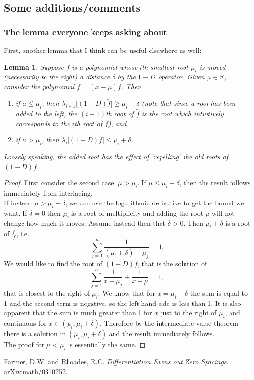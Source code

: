 \documentclass[11pt]{article}
\newcommand{\R}{\mathbb{R}}
\newtheorem{lemma}[theorem]{Lemma}
\begin{document}
\subsection{Some additions/comments}
\subsubsection{The lemma everyone keeps asking about}
First, another lemma that I think can be useful elsewhere as well:
\begin{lemma}
	Suppose $f$ is a polynomial whose $i$th smallest root $\mu_i$ is moved (necessarily to the right) a distance $\delta$ by the $1-D$ operator. Given $\mu \in \R$, consider the polynomial $\tilde{f} = (x-\mu)f$. Then
	\begin{enumerate}
		\item if $\mu \leq \mu_i$, then $\lambda_{i+1}\big[(1-D)\tilde{f}\big] \geq \mu_i + \delta$ (note that since a root has been added to the left, the $(i+1)$th root of $\tilde{f}$ is the root which intuitively corresponds to the $i$th root of $f$), and 
		\item if $\mu > \mu_i$, then $\lambda_{i}\big[(1-D)\tilde{f}\big] \leq \mu_i + \delta$.
	\end{enumerate}
	Loosely speaking, the added root has the effect of `repelling' the old roots of $(1-D)f$.
\end{lemma}
\begin{proof}
	First consider the second case, $\mu > \mu_i$. If $\mu \leq \mu_i + \delta$, then the result follows immediately from interlacing. \\
	If instead $\mu > \mu_i + \delta$, we can use the logarithmic derivative to get the bound we want. If $\delta=0$ then $\mu_i$ is a root of multiplicity and adding the root $\mu$ will not change how much it moves. Assume instead then that $\delta>0$. Then $\mu_i+\delta$ is a root of $\frac{f^\prime}{f}$, i.e.
		\[ \sum_{j=1}^n \frac{1}{(\mu_i+\delta)-\mu_j} = 1. \]
	We would like to find the root of $(1-D)\tilde{f}$, that is the solution of
		\[ \sum_{j=1}^n \frac{1}{x-\mu_j} + \frac{1}{x-\mu} = 1, \]
	that is closest to the right of $\mu_i$. We know that for $x=\mu_i+\delta$ the sum is equal to 1 and the second term is negative, so the left hand side is less than 1. It is also apparent that the sum is much greater than 1 for $x$ just to the right of $\mu_i$, and continuous for $x \in (\mu_i, \mu_i+\delta)$. Therefore by the intermediate value theorem there is a solution in $(\mu_i, \mu_i+\delta)$ and the result immediately follows. \\
	The proof for $\mu<\mu_i$ is essentially the same.
\end{proof}

\begin{thebibliography}{9}
 Farmer, D.W. and Rhoades, R.C.
 \emph{Differentiation Evens out Zero Spacings}.
 arXiv:math/0310252.

\end{thebibliography}
\end{document}
